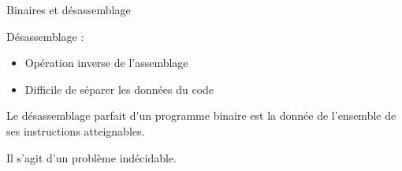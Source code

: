 \documentclass{beamer}
\begin{document}
\begin{frame}{Binaires et désassemblage}
\begin{center}
\end{center}

Désassemblage :
\begin{itemize}
 \item Opération inverse de l'assemblage
 \item Difficile de séparer les données du code
\end{itemize}

\begin{defi}
 Le désassemblage parfait d'un programme binaire est la donnée de l'ensemble de ses instructions atteignables.
\end{defi}
Il s'agit d'un problème indécidable.
\end{frame}
\end{document}
